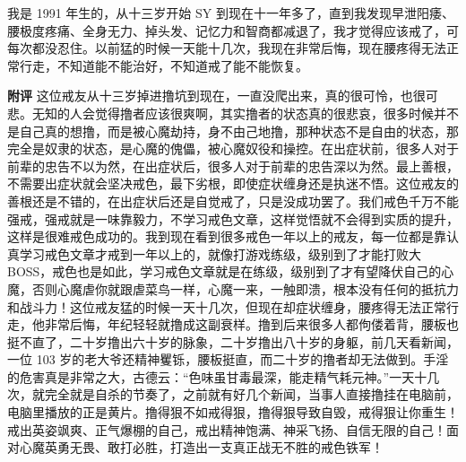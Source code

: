 \begin{case}
    我是 1991 年生的，从十三岁开始 SY 到现在十一年多了，直到我发现早泄阳痿、腰极度疼痛、全身无力、掉头发、记忆力和智商都减退了，我才觉得应该戒了，可每次都没忍住。以前猛的时候一天能十几次，我现在非常后悔，现在腰疼得无法正常行走，不知道能不能治好，不知道戒了能不能恢复。

    \textbf{附评} 这位戒友从十三岁掉进撸坑到现在，一直没爬出来，真的很可怜，也很可悲。无知的人会觉得撸者应该很爽啊，其实撸者的状态真的很悲哀，很多时候并不是自己真的想撸，而是被心魔劫持，身不由己地撸，那种状态不是自由的状态，那完全是奴隶的状态，是心魔的傀儡，被心魔奴役和操控。在出症状前，很多人对于前辈的忠告不以为然，在出症状后，很多人对于前辈的忠告深以为然。最上善根，不需要出症状就会坚决戒色，最下劣根，即使症状缠身还是执迷不悟。这位戒友的善根还是不错的，在出症状后还是自觉戒了，只是没成功罢了。我们戒色千万不能强戒，强戒就是一味靠毅力，不学习戒色文章，这样觉悟就不会得到实质的提升，这样是很难戒色成功的。我到现在看到很多戒色一年以上的戒友，每一位都是靠认真学习戒色文章才戒到一年以上的，就像打游戏练级，级别到了才能打败大 BOSS，戒色也是如此，学习戒色文章就是在练级，级别到了才有望降伏自己的心魔，否则心魔虐你就跟虐菜鸟一样，心魔一来，一触即溃，根本没有任何的抵抗力和战斗力！这位戒友猛的时候一天十几次，但现在却症状缠身，腰疼得无法正常行走，他非常后悔，年纪轻轻就撸成这副衰样。撸到后来很多人都佝偻着背，腰板也挺不直了，二十岁撸出六十岁的脉象，二十岁撸出八十岁的身躯，前几天看新闻，一位 103 岁的老大爷还精神矍铄，腰板挺直，而二十岁的撸者却无法做到。手淫的危害真是非常之大，古德云：“色味虽甘毒最深，能走精气耗元神。”一天十几次，就完全就是自杀的节奏了，之前就有好几个新闻，当事人直接撸挂在电脑前，电脑里播放的正是黄片。撸得狠不如戒得狠，撸得狠导致自毁，戒得狠让你重生！戒出英姿飒爽、正气爆棚的自己，戒出精神饱满、神采飞扬、自信无限的自己！面对心魔英勇无畏、敢打必胜，打造出一支真正战无不胜的戒色铁军！
\end{case}

